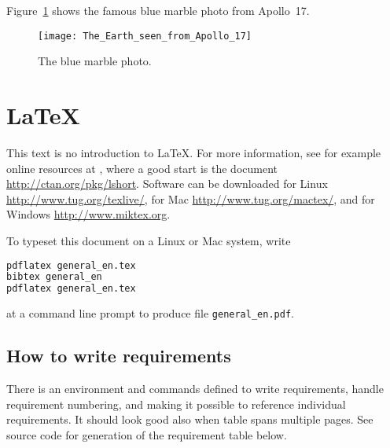 \documentclass[10pt,oneside,english]{lips}
\begin{document}
Figure~\ref{fig:bluemarble} shows the famous blue marble photo from Apollo~17.
\begin{figure}[htbp]
  \centering
  \texttt{[image: The\_Earth\_seen\_from\_Apollo\_17]}
  \caption{The blue marble photo.}
  \label{fig:bluemarble}
\end{figure}

\section{\LaTeX{}}
This text is no introduction to \LaTeX{}. For more information, see
for example online resources at \citep{TUG}, where a good start is the document
\url{http://ctan.org/pkg/lshort}. Software can be downloaded for Linux
\url{http://www.tug.org/texlive/}, for Mac
\url{http://www.tug.org/mactex/}, and for Windows
\url{http://www.miktex.org}.

To typeset this document on a Linux or Mac system, write
\begin{lstlisting}[language=sh,frame=single]
pdflatex general_en.tex
bibtex general_en
pdflatex general_en.tex
\end{lstlisting}
at a command line prompt to produce file \texttt{general_en.pdf}.

\subsection{How to write requirements}
\lipsum[7]

There is an environment and commands defined to write requirements,
handle requirement numbering, and making it possible to reference
individual requirements. It should look good also when table spans
multiple pages. See source code for generation of the requirement
table below.
\end{document}

